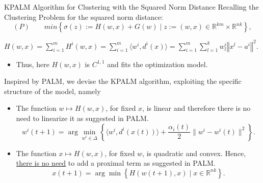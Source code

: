 \documentclass[9pt]{beamer}
\newcommand{\R}{\mathbb{R}} %
\newcommand{\norm}[1]{\left\Vert {#1} \right\Vert} %
\begin{document}
	\begin{frame}{KPALM Algorithm for Clustering with the Squared Norm Distance}
	Recalling the Clustering Problem for the squared norm distance:
		\begin{equation*}
				(P) \qquad min \left\lbrace \sigma(z) := H(w,x) + G(w) \mid z := (w,x) \in \R^{km} \times \R^{nk} \right\rbrace, 
		\end{equation*}
		\begin{center}
		$H(w,x) = \sum\limits_{i=1}^{m} H^i(w,x) = \sum\limits_{i=1}^{m} \langle w^i , d^i(x) \rangle = \sum\limits_{i=1}^m\sum\limits_{l=1}^k w^i_l \norm{x^l - a^i}^2$.\\
		\end{center}
		\begin{itemize}[<+->]
	    	\item Thus, here $H(w,x)$ is $C^{1,1}$ and fits the optimization model.
    	\end{itemize}
		Inspired by PALM, we devise the KPALM algorithm, exploiting the specific structure of the model, namely
		\pause
		\begin{itemize}[<+->]
	    	\item The function $w \mapsto H(w,x)$, for fixed $x$, is linear and therefore there is no need to linearize it as suggested in PALM.
	    	\begin{equation*}
				w^i(t+1) = \arg\!\min\limits_{w^i \in \Delta} \left\lbrace \langle w^i , d^i(x(t)) \rangle + \frac{\alpha_i(t)}{2} \|w^i - w^i(t)\|^2 \right\rbrace. \label{W_update_step}
			\end{equation*}
	    	\item The function $x \mapsto H(w,x)$, for fixed $w$, is quadratic and convex. Hence, \underline{there is no need} to add a proximal term as suggested in PALM.
	    	\begin{equation*}
				x(t+1) = \arg\!\min \left\lbrace H(w(t+1), x) \mid x \in \mathbb{R}^{nk} \right\rbrace. \label{X_update_step}
			\end{equation*}
	    \end{itemize}
	\end{frame}
	
\end{document}
